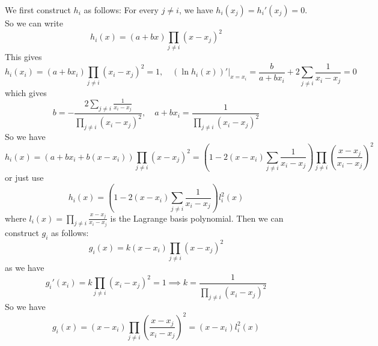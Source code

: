 \documentclass{matharticle}
\begin{document}
\begin{plainblackenv}
	We first construct $h_i$ as follows: For every $j \neq i$, we have $h_i(x_j) = h_i'(x_j) = 0$. So we can write
	\begin{equation*}
		h_i(x) = (a + b x) \prod_{j \neq i} (x - x_j)^2
	\end{equation*}
	This gives
	\begin{equation*}
		h_i(x_i) = (a + b x_i) \prod_{j \neq i} (x_i - x_j)^2 = 1, \quad (\ln h_i(x))'|_{x = x_i} = \frac{b}{a + b x_i} + 2 \sum_{j \neq i} \frac{1}{x_i - x_j} = 0
	\end{equation*}
	which gives
	\begin{equation*}
		b = -\frac{2 \sum_{j \neq i} \frac{1}{x_i - x_j}}{\prod_{j \neq i} (x_i - x_j)^2}, \quad a + b x_i = \frac{1}{\prod_{j \neq i} (x_i - x_j)^2}
	\end{equation*}
	So we have
	\begin{equation*}
		h_i(x) = (a + b x_i + b (x - x_i)) \prod_{j \neq i} (x - x_j)^2 = \left( 1 - 2 (x - x_i) \sum_{j \neq i} \frac{1}{x_i - x_j} \right) \prod_{j \neq i} \left( \frac{x - x_j}{x_i - x_j} \right)^2
	\end{equation*}
	or just use
	\begin{equation}
		h_i(x) = \left(1 - 2 (x - x_i) \sum_{j \neq i} \frac{1}{x_i - x_j}\right) l_i^2(x)
	\end{equation}
	where $l_i(x) = \prod_{j \neq i} \frac{x - x_j}{x_i - x_j}$ is the Lagrange basis polynomial. Then we can construct $g_i$ as follows:
	\begin{equation*}
		g_i(x) = k (x - x_i) \prod_{j \neq i} (x - x_j)^2
	\end{equation*}
	as we have
	\begin{equation*}
		g_i'(x_i) = k \prod_{j \neq i} (x_i - x_j)^2 = 1 \implies k = \frac{1}{\prod_{j \neq i} (x_i - x_j)^2}
	\end{equation*}
	So we have
	\begin{equation}
		g_i(x) = (x - x_i) \prod_{j \neq i} \left( \frac{x - x_j}{x_i - x_j} \right)^2 = (x - x_i) l_i^2(x)
	\end{equation}
\end{plainblackenv}
\end{document}
